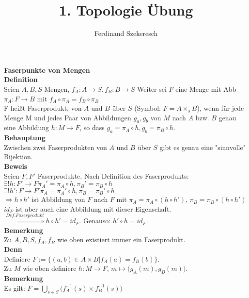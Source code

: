 \documentclass{article}
\title{1. Topologie Übung}
\author{Ferdinand Szekeresch}
\begin{document}
\maketitle

\textbf{Faserpunkte von Mengen}\\
\textbf{Definition}\\
Seien $A,B,S$ Mengen, $f_A : A \rightarrow S, f_B: B \rightarrow S$ Weiter sei $F$ eine Menge mit Abb $\pi_A : F \rightarrow B$ mit $f_A \circ \pi_A = f_B \circ \pi_B$ \\
F heißt Faserprodukt, von $A$ und $B$ über $S$ (Symbol: $F = A\times_sB$), wenn für jede Menge M und jedes Paar von Abbildungen $g_a,g_b$ von $M$ nach $A$ bzw. $B$ genau eine Abbildung $h: M \rightarrow F$, so dass $g_a = \pi_A \circ h, g_b = \pi_B \circ h$. \\
\textbf{Behauptung}\\
Zwischen zwei Faserprodukten von $A$ und $B$ über $S$ gibt es genau eine "sinnvolle" Bijektion.\\
\textbf{Beweis}\\
Seien $F,F'$ Faserprodukte. Nach Definition des Faserprodukts:\\
$\exists ! h: F' \rightarrow F \pi_A' = \pi_A\circ h, \pi_B' = \pi_B\circ h$\\
$\exists ! h': F \rightarrow F' \pi_A = \pi_A'\circ h, \pi_B = \pi_B'\circ h$\\
$\Rightarrow h\circ h'$ ist Abbildung von $F$ nach $F$ mit $\pi_A = \pi_A\circ (h\circ h')$, $\pi_B = \pi_B\circ (h\circ h')$
$id_F$ ist aber auch eine Abbildung mit dieser Eigenschaft.\\
$\stackrel{Def. Faserprodukt}{\Rightarrow} h \circ h' = id_F$. Genauso: $h' \circ h = id_F$.\\
\textbf{Bemerkung}\\
Zu $A,B,S,f_A,f_B$ wie oben existiert immer ein Faserprodukt.\\
\textbf{Denn}\\
Definiere $F:=\{(a,b)\in A\times B | f_A(a) = f_B(b)\}$.\\
Zu $M$ wie oben definiere $h:M\rightarrow F$, $m \mapsto\big(g_A(m),g_B(m)\big)$.\\
\textbf{Bemerkung}\\
Es gilt: $F = \bigcup\limits_{s\in S}\big(f_A^{-1}(s)\times f_B^{-1}(s)\big)$
\end{document}
